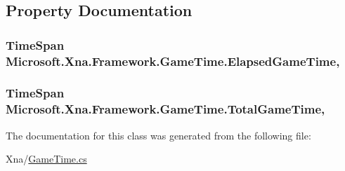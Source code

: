 \subsection{Property Documentation}
\hypertarget{class_microsoft_1_1_xna_1_1_framework_1_1_game_time_acd6a8a0227aae3ab1c6029fc8d252e5e}{}
\subsubsection[{Elapsed\+Game\+Time}]{\setlength{\rightskip}{0pt plus 5cm}Time\+Span Microsoft.\+Xna.\+Framework.\+Game\+Time.\+Elapsed\+Game\+Time\hspace{0.3cm}{\ttfamily [get]}, {\ttfamily [set]}}\label{class_microsoft_1_1_xna_1_1_framework_1_1_game_time_acd6a8a0227aae3ab1c6029fc8d252e5e}
\hypertarget{class_microsoft_1_1_xna_1_1_framework_1_1_game_time_a968b315dfd452351f09faf1c255d9c00}{}
\subsubsection[{Total\+Game\+Time}]{\setlength{\rightskip}{0pt plus 5cm}Time\+Span Microsoft.\+Xna.\+Framework.\+Game\+Time.\+Total\+Game\+Time\hspace{0.3cm}{\ttfamily [get]}, {\ttfamily [set]}}\label{class_microsoft_1_1_xna_1_1_framework_1_1_game_time_a968b315dfd452351f09faf1c255d9c00}


The documentation for this class was generated from the following file\+:\begin{DoxyCompactItemize}
\item 
Xna/\hyperlink{_game_time_8cs}{Game\+Time.\+cs}\end{DoxyCompactItemize}
